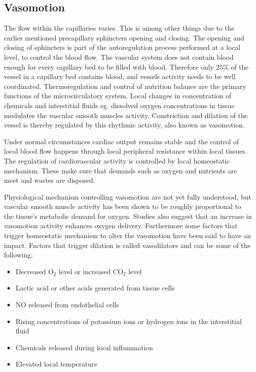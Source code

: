 \subsection{Vasomotion}

The flow within the capillaries varies. This is among other things due to the earlier mentioned precapillary sphincters opening and closing. The opening and closing of sphincters is part of the autoregulation process performed at a local level, to control the blood flow. The vascular system does not contain blood enough for every capillary bed to be filled with blood. Therefore only $25\%$ of the vessel in a capillary bed contains blood, and vessels activity needs to be well coordinated. Thermoregulation and control of nutrition balance are the primary functions of the microcirculatory system. Local changes in concentration of chemicals and interstitial fluids eg. dissolved oxygen concentrations in tissue modulates the vascular smooth muscles activity. Constriction and dilation of the vessel is thereby regulated by this rhythmic activity, also known as vasomotion.\cite{martini2012,geyer2004}

Under normal circumstances cardiac output remains stable and the control of local blood flow happens through local peripheral resistance within local tissues. The regulation of cardiovascular activity is controlled by local homeostatic mechanism. These make sure that demands such as oxygen and nutrients are meet and wastes are disposed.\cite{martini2012}

Physiological mechanism controlling vasomotion are not yet fully understood, but vascular smooth muscle activity has been shown to be roughly proportional to the tissue’s metabolic demand for oxygen.\cite{geyer2004} Studies also suggest that an increase in vasomotion activity enhances oxygen delivery\cite{goldman2001}. Furthermore some factors that trigger homeostatic mechanism to alter the vasomotion have been said to have an impact. Factors that trigger dilation is called vasodilators and can be some of the following:\cite{martini2012,geyer2004}  
\begin{itemize}
	\item Decreased O$_{2}$ level or increased CO$_{2}$ level
	\item Lactic acid or other acids generated from tissue cells
	\item NO released from endothelial cells
	\item Rising concentrations of potassium ions or hydrogen ions in the interstitial fluid
	\item Chemicals released during local inflammation
	\item Elevated local temperature
\end{itemize} 

